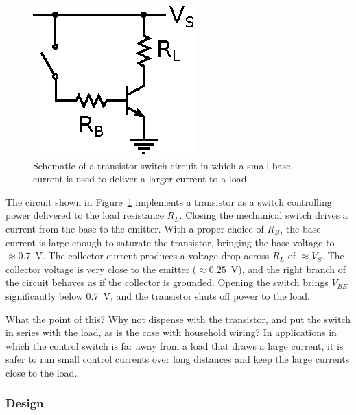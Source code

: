 \documentclass[11pt]{article}
\begin{document}
\begin{figure}[ht]
  \begin{center}
    \includegraphics{transistorswitch.eps}
    \caption{Schematic of a transistor switch circuit in which a small
      base current is used to deliver a larger current to a load.}
    \label{fig:transistorswitch}
  \end{center}
\end{figure}

The circuit shown in Figure~\ref{fig:transistorswitch} implements a
transistor as a switch controlling power delivered to the load
resistance $R_L$.  Closing the mechanical switch drives a current from
the base to the emitter.  With a proper choice of $R_B$, the base
current is large enough to saturate the transistor, bringing the base
voltage to $\approx0.7$~V.  The collector current produces a voltage
drop across $R_L$ of $\approx V_S$. The collector voltage is very close to
the emitter ($\approx 0.25$~V), and the right branch of the circuit
behaves as if the collector is grounded. Opening the switch
brings $V_{BE}$ significantly below 0.7~V, and the transistor shuts
off power to the load.

What the point of this? Why not dispense with the transistor, and put
the switch in series with the load, as is the case with household
wiring? In applications in which the control switch is far away from a
load that draws a large current, it is safer to run small 
control currents over long distances and keep the large currents close
to the load.

\subsubsection*{Design}
\end{document}
